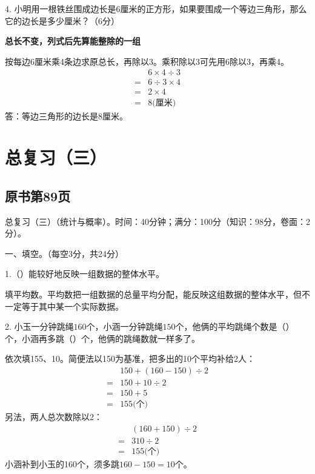 4. 小明用一根铁丝围成边长是\(6\)厘米的正方形，如果要围成一个等边三角形，那么它的边长是多少厘米？（6分）\par
\begin{BookAnswer}
\textbf{总长不变，列式后先算能整除的一组}\par 按每边6厘米乘4条边求原总长，再除以3。乘积除以3可先用6除以3，再乘4。\[\begin{aligned}&6\times4\div3\\={}&6\div3\times4\\={}&2\times4\\={}&8\text{(厘米)}\end{aligned}\]答：等边三角形的边长是8厘米。
\end{BookAnswer}


\section{总复习（三）}



\subsection*{原书第89页}

总复习（三）（统计与概率）。时间：40分钟；满分：100分（知识：98分，卷面：2分）。\par 一、填空。（每空3分，共24分）\par 1.（\hspace{1.8em}）能较好地反映一组数据的整体水平。\par
\begin{BookAnswer}
填平均数。平均数把一组数据的总量平均分配，能反映这组数据的整体水平，但不一定等于其中某一个实际数据。
\end{BookAnswer}

2. 小玉一分钟跳绳\(160\)个，小涵一分钟跳绳\(150\)个，他俩的平均跳绳个数是（\hspace{1.8em}）个，小涵再多跳（\hspace{1.8em}）个，他俩的跳绳数就一样多了。\par
\begin{BookAnswer}
依次填155、10。简便法以150为基准，把多出的10个平均补给2人：\[\begin{aligned}&150+(160-150)\div2\\={}&150+10\div2\\={}&150+5\\={}&155\text{(个)}\end{aligned}\]另法，两人总次数除以2：\[\begin{aligned}&(160+150)\div2\\={}&310\div2\\={}&155\text{(个)}\end{aligned}\]小涵补到小玉的160个，须多跳\(160-150=10\)个。
\end{BookAnswer}

